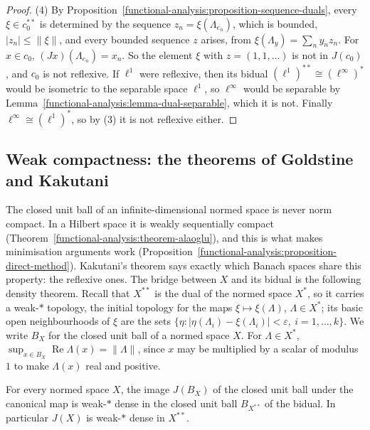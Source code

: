 \begin{proof}
(4) By Proposition~\ref{functional-analysis:proposition-sequence-duals}, every $\xi \in c_0^{**}$ is determined by the sequence $z_n = \xi(\Lambda_{e_n})$, which is bounded, $|z_n| \leq \|\xi\|$, and every bounded
sequence $z$ arises, from $\xi(\Lambda_y) = \sum_ny_nz_n$. For $x \in c_0$, $(Jx)(\Lambda_{e_n}) = x_n$. So the element $\xi$ with $z = (1, 1, \ldots)$ is not in $J(c_0)$, and $c_0$ is not reflexive. If $\ell^1$ were
reflexive, then its bidual $(\ell^1)^{**} \cong (\ell^\infty)^*$ would be isometric to the separable space $\ell^1$, so $\ell^\infty$ would be separable by Lemma~\ref{functional-analysis:lemma-dual-separable},
which it is not. Finally $\ell^\infty \cong (\ell^1)^*$, so by (3) it is not reflexive either.
\end{proof}

\subsection{Weak compactness: the theorems of Goldstine and Kakutani}\label{functional-analysis:subsection-kakutani}

The closed unit ball of an infinite-dimensional normed space is never norm compact. In a Hilbert space it is weakly sequentially compact (Theorem~\ref{functional-analysis:theorem-alaoglu}), and this is
what makes minimisation arguments work (Proposition~\ref{functional-analysis:proposition-direct-method}). Kakutani's theorem says exactly which Banach spaces share this property: the reflexive ones.
The bridge between $X$ and its bidual is the following density theorem. Recall that $X^{**}$ is the dual of the normed space $X^*$, so it carries a weak-$*$ topology, the initial topology for the
maps $\xi \mapsto \xi(\Lambda)$, $\Lambda \in X^*$; its basic open neighbourhoods of $\xi$ are the sets $\{\eta : |\eta(\Lambda_i) - \xi(\Lambda_i)| < \varepsilon, \ i = 1, \ldots, k\}$. We write $B_X$ for the closed unit
ball of a normed space $X$. For $\Lambda \in X^*$, $\sup_{x \in B_X}\operatorname{Re}\Lambda(x) = \|\Lambda\|$, since $x$ may be multiplied by a scalar of modulus $1$ to make $\Lambda(x)$ real and positive.

\begin{theorem}[Goldstine]\label{functional-analysis:theorem-goldstine}
For every normed space $X$, the image $J(B_X)$ of the closed unit ball under the canonical map is weak-$*$ dense in the closed unit ball $B_{X^{**}}$ of the bidual. In particular $J(X)$ is weak-$*$ dense
in $X^{**}$.
\end{theorem}

